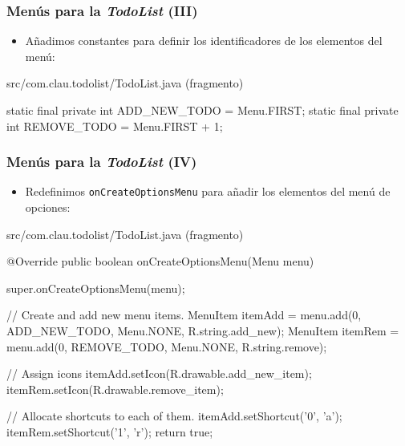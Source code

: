 \documentclass[hyperref={pdfpagelabels=true},ucs]{beamer}
\begin{document}
\begin{frame}[fragile]
\frametitle{Menús para la \emph{TodoList} (III)}

\begin{itemize}

\item Añadimos constantes para definir los identificadores de los
  elementos del menú:
\end{itemize}

\begin{tiny}
\begin{block}{src/com.clau.todolist/TodoList.java (fragmento)}
\begin{java}
static final private int ADD_NEW_TODO = Menu.FIRST;
static final private int REMOVE_TODO = Menu.FIRST + 1;
\end{java}
\end{block}
\end{tiny}

\end{frame}


\begin{frame}[fragile]
\frametitle{Menús para la \emph{TodoList} (IV)}

\begin{itemize}
\item Redefinimos \verb|onCreateOptionsMenu| para añadir los elementos
  del menú de opciones:
\end{itemize}

\begin{tiny}
\begin{block}{src/com.clau.todolist/TodoList.java (fragmento)}
\begin{java}
@Override
public boolean onCreateOptionsMenu(Menu menu) {
  super.onCreateOptionsMenu(menu);

  // Create and add new menu items.
  MenuItem itemAdd = menu.add(0, ADD_NEW_TODO, Menu.NONE,
                              R.string.add_new);
  MenuItem itemRem = menu.add(0, REMOVE_TODO, Menu.NONE,
                              R.string.remove);

  // Assign icons
  itemAdd.setIcon(R.drawable.add_new_item);
  itemRem.setIcon(R.drawable.remove_item);

  // Allocate shortcuts to each of them.
  itemAdd.setShortcut('0', 'a');
  itemRem.setShortcut('1', 'r');
  return true;
}
\end{java}
\end{block}
\end{tiny}

\end{frame}
\end{document}
